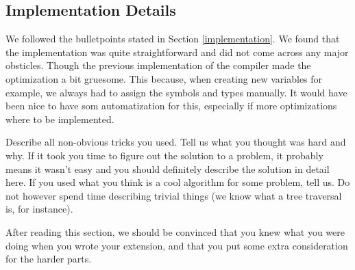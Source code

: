 \subsection{Implementation Details}
\label{sec:details}
We followed the bulletpoints stated in Section \ref{implementation}. We found that the implementation was quite straightforward and did not 
come across any major obsticles. Though the previous implementation of the compiler made the optimization a bit gruesome. This because, when creating
new variables for example, we always had to assign the symbols and types manually. It would have been nice to have som automatization for this, 
especially if more optimizations where to be implemented.

Describe all non-obvious tricks you used. Tell us what you thought was hard and
why. If it took you time to figure out the solution to a problem, it probably
means it wasn't easy and you should definitely describe the solution in detail
here. If you used what you think is a cool algorithm for some problem, tell us.
Do not however spend time describing trivial things (we know what a tree traversal
is, for instance).

After reading this section, we should be convinced that you knew what you were
doing when you wrote your extension, and that you put some extra consideration
for the harder parts.
